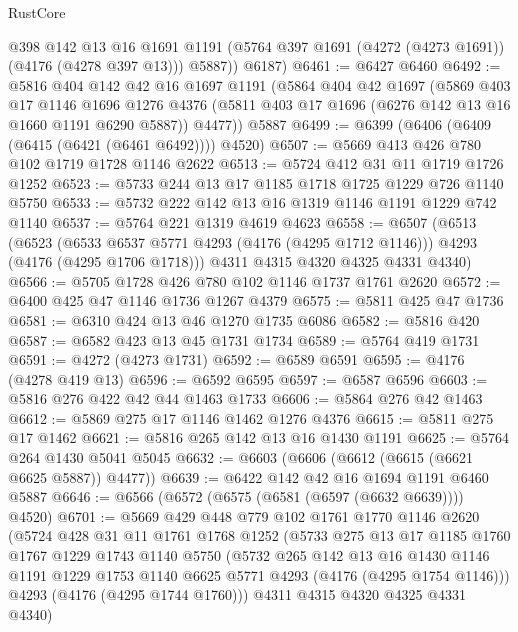 \begin{lexlean}{RustCore}
\begin{coremodule}
          @398
          @142
          @13
          @16
          @1691
          @1191
          (@5764 @397 @1691 (@4272 (@4273 @1691)) (@4176 (@4278 @397 @13)))
          @5887))
      @6187)
@6461 := @6427 @6460
@6492 := @5816
    @404
    @142
    @42
    @16
    @1697
    @1191
    (@5864
      @404
      @42
      @1697
      (@5869
        @403
        @17
        @1146
        @1696
        @1276
        @4376
        (@5811 @403 @17 @1696 (@6276 @142 @13 @16 @1660 @1191 @6290 @5887))
        @4477))
    @5887
@6499 := @6399 (@6406 (@6409 (@6415 (@6421 (@6461 @6492)))) @4520)
@6507 := @5669 @413 @426 @780 @102 @1719 @1728 @1146 @2622
@6513 := @5724 @412 @31 @11 @1719 @1726 @1252
@6523 := @5733 @244 @13 @17 @1185 @1718 @1725 @1229 @726 @1140 @5750
@6533 := @5732 @222 @142 @13 @16 @1319 @1146 @1191 @1229 @742 @1140
@6537 := @5764 @221 @1319 @4619 @4623
@6558 := @6507
    (@6513
      (@6523
        (@6533 @6537 @5771 @4293 (@4176 (@4295 @1712 @1146)))
        @4293
        (@4176 (@4295 @1706 @1718)))
      @4311
      @4315
      @4320
      @4325
      @4331
      @4340)
@6566 := @5705 @1728 @426 @780 @102 @1146 @1737 @1761 @2620
@6572 := @6400 @425 @47 @1146 @1736 @1267 @4379
@6575 := @5811 @425 @47 @1736
@6581 := @6310 @424 @13 @46 @1270 @1735 @6086
@6582 := @5816 @420
@6587 := @6582 @423 @13 @45 @1731 @1734
@6589 := @5764 @419 @1731
@6591 := @4272 (@4273 @1731)
@6592 := @6589 @6591
@6595 := @4176 (@4278 @419 @13)
@6596 := @6592 @6595
@6597 := @6587 @6596
@6603 := @5816 @276 @422 @42 @44 @1463 @1733
@6606 := @5864 @276 @42 @1463
@6612 := @5869 @275 @17 @1146 @1462 @1276 @4376
@6615 := @5811 @275 @17 @1462
@6621 := @5816 @265 @142 @13 @16 @1430 @1191
@6625 := @5764 @264 @1430 @5041 @5045
@6632 := @6603 (@6606 (@6612 (@6615 (@6621 @6625 @5887)) @4477))
@6639 := @6422 @142 @42 @16 @1694 @1191 @6460 @5887
@6646 := @6566 (@6572 (@6575 (@6581 (@6597 (@6632 @6639)))) @4520)
@6701 := @5669
    @429
    @448
    @779
    @102
    @1761
    @1770
    @1146
    @2620
    (@5724
      @428
      @31
      @11
      @1761
      @1768
      @1252
      (@5733
        @275
        @13
        @17
        @1185
        @1760
        @1767
        @1229
        @1743
        @1140
        @5750
        (@5732
          @265
          @142
          @13
          @16
          @1430
          @1146
          @1191
          @1229
          @1753
          @1140
          @6625
          @5771
          @4293
          (@4176 (@4295 @1754 @1146)))
        @4293
        (@4176 (@4295 @1744 @1760)))
      @4311
      @4315
      @4320
      @4325
      @4331
      @4340)

\end{coremodule}
\end{lexlean}
